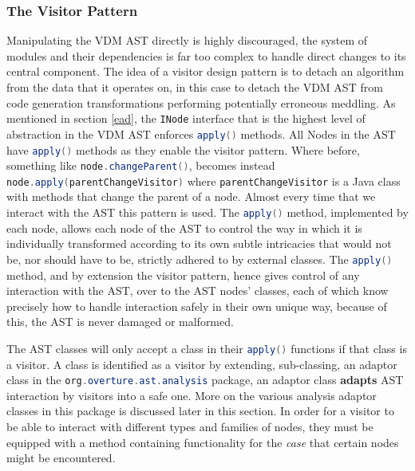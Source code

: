	\subsubsection{The Visitor Pattern} \label{vp}
	Manipulating the VDM AST directly is highly discouraged, the system of modules and their dependencies is far too complex to handle direct changes to its central component. The idea of a visitor design pattern is to detach an algorithm from the data that it operates on, in this case to detach the VDM AST from code generation transformations performing potentially erroneous meddling. As mentioned in section \ref{ead}, the \lstinline[language=Java]{INode} interface that is the highest level of abstraction in the VDM AST enforces \lstinline[language=Java]{apply()} methods. All Nodes in the AST have \lstinline[language=Java]{apply()} methods as they enable the visitor pattern. Where before, something like \lstinline[language=Java]{node.changeParent()}, becomes instead \lstinline[language=Java]{node.apply(parentChangeVisitor)} where \lstinline[language=Java]{parentChangeVisitor} is a Java class with methods that change the parent of a node. Almost every time that we interact with the AST this pattern is used. The \lstinline[language=Java]{apply()} method, implemented by each node, allows each node of the AST to control the way in which it is individually transformed according to its own subtle intricacies that would not be, nor should have to be, strictly adhered to by external classes. The \lstinline[language=Java]{apply()} method, and by extension the visitor pattern, hence gives control of any interaction with the AST, over to the AST nodes' classes, each of which know precisely how to handle interaction safely in their own unique way, because of this, the AST is never damaged or malformed. 

	The AST classes will only accept a class in their \lstinline[language=Java]{apply()} functions if that class is a visitor. A class is identified as a visitor by extending, sub-classing, an adaptor class in the \lstinline[language=Java]{org.overture.ast.analysis} package, an adaptor class \textbf{adapts} AST interaction by visitors into a safe one. More on the various analysis adaptor classes in this package is discussed later in this section. In order for a visitor to be able to interact with different types and families of nodes, they must be equipped with a method containing functionality for the \emph{case} that certain nodes might be encountered.


